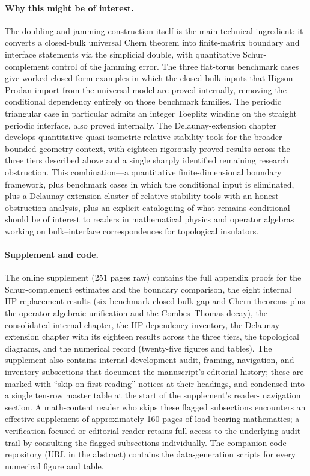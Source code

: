\documentclass[11pt]{article}
\begin{document}
\paragraph{Why this might be of interest.}
The doubling-and-jamming construction itself is the main technical
ingredient: it converts a closed-bulk universal Chern theorem into
finite-matrix boundary and interface statements via the simplicial double,
with quantitative Schur-complement control of the jamming error. The
three flat-torus benchmark cases give worked closed-form examples in which
the closed-bulk inputs that Higson--Prodan import from the universal model
are proved internally, removing the conditional dependency entirely on
those benchmark families. The periodic triangular case in particular
admits an integer Toeplitz winding on the straight periodic interface, also
proved internally. The Delaunay-extension chapter develops quantitative
quasi-isometric relative-stability tools for the broader bounded-geometry
context, with eighteen rigorously proved results across the three tiers
described above and a single sharply identified remaining research
obstruction. This combination---a quantitative finite-dimensional
boundary framework, plus benchmark cases in which the conditional input is
eliminated, plus a Delaunay-extension cluster of relative-stability tools
with an honest obstruction analysis, plus an explicit cataloguing of what
remains conditional---should be of interest to readers in mathematical
physics and operator algebras working on bulk--interface correspondences
for topological insulators.

\paragraph{Supplement and code.}
The online supplement (251 pages raw) contains the full appendix proofs for
the Schur-complement estimates and the boundary comparison, the eight
internal HP-replacement results (six benchmark closed-bulk gap and Chern
theorems plus the operator-algebraic unification and the Combes--Thomas
decay), the consolidated internal chapter, the HP-dependency inventory,
the Delaunay-extension chapter with its eighteen results across the three
tiers, the topological diagrams, and the numerical record (twenty-five
figures and tables). The supplement also contains internal-development
audit, framing, navigation, and inventory subsections that document the
manuscript's editorial history; these are marked with
``skip-on-first-reading'' notices at their headings, and condensed into a
single ten-row master table at the start of the supplement's reader-%
navigation section. A math-content reader who skips these flagged
subsections encounters an effective supplement of approximately 160 pages
of load-bearing mathematics; a verification-focused or editorial reader
retains full access to the underlying audit trail by consulting the
flagged subsections individually. The companion code repository (URL in
the abstract) contains the data-generation scripts for every numerical
figure and table.
\end{document}
